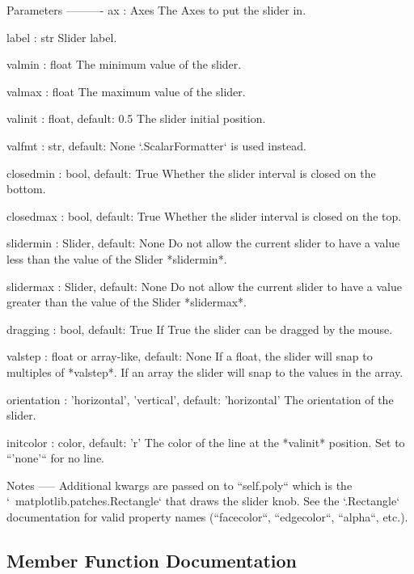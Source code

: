 \begin{DoxyVerb}Parameters
----------
ax : Axes
    The Axes to put the slider in.

label : str
    Slider label.

valmin : float
    The minimum value of the slider.

valmax : float
    The maximum value of the slider.

valinit : float, default: 0.5
    The slider initial position.

valfmt : str, default: None
    `.ScalarFormatter` is used instead.

closedmin : bool, default: True
    Whether the slider interval is closed on the bottom.

closedmax : bool, default: True
    Whether the slider interval is closed on the top.

slidermin : Slider, default: None
    Do not allow the current slider to have a value less than
    the value of the Slider *slidermin*.

slidermax : Slider, default: None
    Do not allow the current slider to have a value greater than
    the value of the Slider *slidermax*.

dragging : bool, default: True
    If True the slider can be dragged by the mouse.

valstep : float or array-like, default: None
    If a float, the slider will snap to multiples of *valstep*.
    If an array the slider will snap to the values in the array.

orientation : {'horizontal', 'vertical'}, default: 'horizontal'
    The orientation of the slider.

initcolor : color, default: 'r'
    The color of the line at the *valinit* position. Set to ``'none'``
    for no line.

Notes
-----
Additional kwargs are passed on to ``self.poly`` which is the
`~matplotlib.patches.Rectangle` that draws the slider knob.  See the
`.Rectangle` documentation for valid property names (``facecolor``,
``edgecolor``, ``alpha``, etc.).
\end{DoxyVerb}
 

\subsection{Member Function Documentation}
\mbox{\label{classmatplotlib_1_1widgets_1_1Slider_aa8e2587541b1561321e75a644335f653}} 
